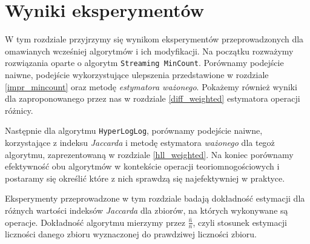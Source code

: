 \chapter{Wyniki eksperymentów}
\thispagestyle{chapterBeginStyle}

W tym rozdziale przyjrzymy się wynikom  eksperymentów przeprowadzonych dla omawianych wcześniej algorytmów i ich modyfikacji. Na początku rozważymy rozwiązania oparte o algorytm \texttt{Streaming MinCount}. 
Porównamy podejście naiwne, podejście wykorzystujące ulepszenia przedstawione w rozdziale \ref{impr_mincount} oraz metodę \textit{estymatora ważonego}. Pokażemy również wyniki dla zaproponowanego przez nas w rozdziale \ref{diff_weighted} estymatora operacji różnicy.

 Następnie dla algorytmu \texttt{HyperLogLog}, 
 porównamy podejście naiwne, korzystające z indeksu \textit{Jaccarda} i metodę estymatora \textit{ważonego} dla tegoż algorytmu, zaprezentowaną w rozdziale \ref{hll_weighted}. Na koniec porównamy efektywność obu algorytmów w kontekście operacji teoriomnogościowych i postaramy się określić które z nich sprawdzą się najefektywniej w praktyce. 

Eksperymenty przeprowadzone w tym rozdziale badają dokładność estymacji dla różnych wartości indeksów \textit{Jaccarda} dla zbiorów, na których wykonywane są operacje. Dokładność algorytmu mierzymy przez $\frac{\hat{n}}{n}$, czyli stosunek estymacji liczności danego zbioru wyznaczonej do prawdziwej liczności zbioru.

